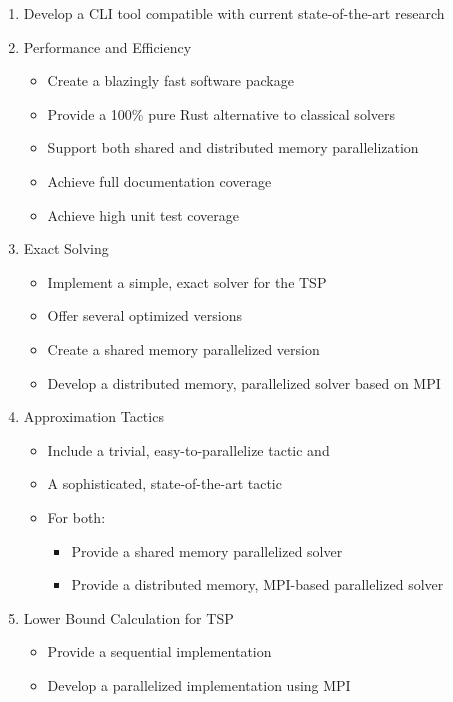 \begin{enumerate}
  \item Develop a CLI tool compatible with current state-of-the-art research
  \item Performance and Efficiency
    \begin{itemize}
      \item Create a blazingly fast software package
      \item Provide a 100\% pure Rust alternative to classical solvers
      \item Support both shared and distributed memory parallelization
      \item Achieve full documentation coverage
      \item Achieve high unit test coverage
    \end{itemize}
  \item Exact Solving
    \begin{itemize}
      \item Implement a simple, exact solver for the \ac{TSP}
      \item Offer several optimized versions
      \item Create a shared memory parallelized version
      \item Develop a distributed memory, parallelized solver based on \ac{MPI}
    \end{itemize}
  \item Approximation Tactics
    \begin{itemize}
      \item Include a trivial, easy-to-parallelize tactic and
      \item A sophisticated, state-of-the-art tactic
      \item For both:
        \begin{itemize}
          \item Provide a shared memory parallelized solver
          \item Provide a distributed memory, \ac{MPI}-based parallelized solver
        \end{itemize}
    \end{itemize}
  \item Lower Bound Calculation for \ac{TSP}
    \begin{itemize}
      \item Provide a sequential implementation
      \item Develop a parallelized implementation using \ac{MPI}
    \end{itemize}
\end{enumerate}

